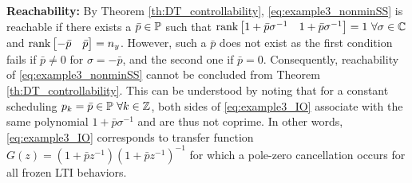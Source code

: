 \textbf{Reachability:} By Theorem \ref{th:DT_controllability}, \eqref{eq:example3_nonminSS} is reachable if there exists a $\bar{p}\in\mathbb{P}$ such that $\textrm{rank} \begin{bmatrix} 1 + \bar{p}\sigma^{-1} & 1 + \bar{p}\sigma^{-1}\end{bmatrix} = 1 \ \forall \sigma \in \mathbb{C}$ and $\textrm{rank} \begin{bmatrix} -\bar{p} & \bar{p} \end{bmatrix} = n_y$. However, such a $\bar{p}$ does not exist as the first condition fails if $\bar{p} \neq 0$ for $\sigma = -\bar{p}$, and the second one if $\bar{p} = 0$. Consequently, reachability of \eqref{eq:example3_nonminSS} cannot be concluded from Theorem \ref{th:DT_controllability}. This can be understood by noting that for a constant scheduling $p_k = \bar{p}\in\mathbb{P} \ \forall k\in\mathbb{Z}$, both sides of \eqref{eq:example3_IO} associate with the same polynomial $1+\bar{p} \sigma^{-1}$ and are thus not coprime. In other words, \eqref{eq:example3_IO} corresponds to transfer function $G(z) = (1 + \bar{p} z^{-1})(1 + \bar{p} z^{-1})^{-1}$ for which a pole-zero cancellation occurs for all frozen LTI behaviors. 

